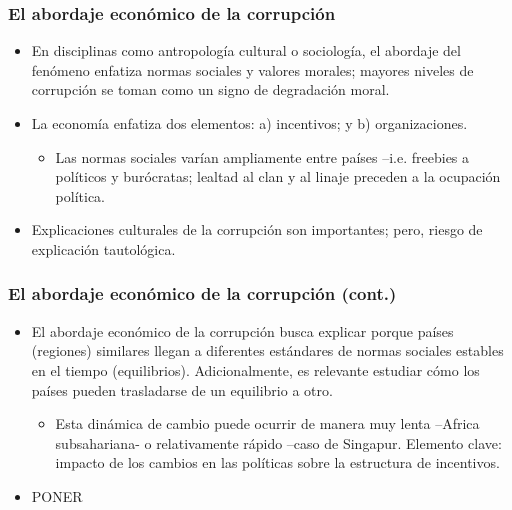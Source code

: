\documentclass[handout,final,xcolor=dvipsnames]{beamer}
\begin{document}
\begin{frame}\frametitle{El abordaje económico de la corrupción}
\begin{itemize}\itemsep 10pt
\item En disciplinas como antropología cultural o sociología, el
  abordaje del fenómeno enfatiza normas sociales y valores morales;
  mayores niveles de corrupción se toman como un signo de degradación
  moral.
\item La economía enfatiza dos elementos: a) incentivos; y b)
  organizaciones. 
\begin{itemize}
\item Las normas sociales varían ampliamente entre países
  --i.e. freebies a políticos y burócratas; lealtad al clan y al
  linaje preceden a la ocupación política. 
\end{itemize}
\item Explicaciones culturales de la corrupción son importantes;
pero, riesgo de explicación tautológica. 
\end{itemize}
\end{frame}


\begin{frame}\frametitle{El abordaje económico de la corrupción (cont.)}
\begin{itemize}\itemsep 10pt
\item El abordaje económico de la corrupción busca explicar porque
  países (regiones) similares llegan a diferentes estándares de normas
  sociales estables en el tiempo (equilibrios). Adicionalmente, es relevante
  estudiar cómo los países pueden trasladarse de un equilibrio a
  otro. 
\begin{itemize}
\item Esta dinámica de cambio puede ocurrir de manera muy lenta
  --Africa subsahariana- o relativamente rápido --caso de
  Singapur. Elemento clave: impacto de los cambios en las políticas
  sobre la estructura de incentivos. 
\end{itemize}
\item  PONER
\end{itemize}
\end{frame}
\end{document}
